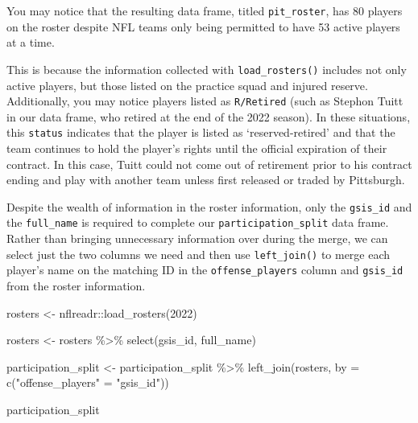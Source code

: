 \documentclass[
  letterpaper,
]{krantz}
\newenvironment{Shaded}{\begin{snugshade}}{\end{snugshade}}
\newcommand{\AttributeTok}[1]{\textcolor[rgb]{0.40,0.45,0.13}{#1}}
\newcommand{\DecValTok}[1]{\textcolor[rgb]{0.68,0.00,0.00}{#1}}
\newcommand{\FunctionTok}[1]{\textcolor[rgb]{0.28,0.35,0.67}{#1}}
\newcommand{\NormalTok}[1]{\textcolor[rgb]{0.00,0.23,0.31}{#1}}
\newcommand{\OtherTok}[1]{\textcolor[rgb]{0.00,0.23,0.31}{#1}}
\newcommand{\SpecialCharTok}[1]{\textcolor[rgb]{0.37,0.37,0.37}{#1}}
\newcommand{\StringTok}[1]{\textcolor[rgb]{0.13,0.47,0.30}{#1}}
\begin{document}
\begin{tcolorbox}[enhanced jigsaw, colback=white, leftrule=.75mm, breakable, colframe=quarto-callout-note-color-frame, bottomtitle=1mm, rightrule=.15mm, left=2mm, opacityback=0, bottomrule=.15mm, arc=.35mm, coltitle=black, colbacktitle=quarto-callout-note-color!10!white, toptitle=1mm, titlerule=0mm, title=\textcolor{quarto-callout-note-color}{\faInfo}\hspace{0.5em}{Note}, toprule=.15mm, opacitybacktitle=0.6]

You may notice that the resulting data frame, titled
\texttt{pit\_roster}, has 80 players on the roster despite NFL teams
only being permitted to have 53 active players at a time.

This is because the information collected with \texttt{load\_rosters()}
includes not only active players, but those listed on the practice squad
and injured reserve. Additionally, you may notice players listed as
\texttt{R/Retired} (such as Stephon Tuitt in our data frame, who retired
at the end of the 2022 season). In these situations, this
\texttt{status} indicates that the player is listed as
`reserved-retired' and that the team continues to hold the player's
rights until the official expiration of their contract. In this case,
Tuitt could not come out of retirement prior to his contract ending and
play with another team unless first released or traded by Pittsburgh.

\end{tcolorbox}

Despite the wealth of information in the roster information, only the
\texttt{gsis\_id} and the \texttt{full\_name} is required to complete
our \texttt{participation\_split} data frame. Rather than bringing
unnecessary information over during the merge, we can select just the
two columns we need and then use \texttt{left\_join()} to merge each
player's name on the matching ID in the \texttt{offense\_players} column
and \texttt{gsis\_id} from the roster information.

\begin{Shaded}
\begin{Highlighting}[]
\NormalTok{rosters }\OtherTok{\textless{}{-}}\NormalTok{ nflreadr}\SpecialCharTok{::}\FunctionTok{load\_rosters}\NormalTok{(}\DecValTok{2022}\NormalTok{)}

\NormalTok{rosters }\OtherTok{\textless{}{-}}\NormalTok{ rosters }\SpecialCharTok{\%\textgreater{}\%}
  \FunctionTok{select}\NormalTok{(gsis\_id, full\_name)}

\NormalTok{participation\_split }\OtherTok{\textless{}{-}}\NormalTok{ participation\_split }\SpecialCharTok{\%\textgreater{}\%}
  \FunctionTok{left\_join}\NormalTok{(rosters, }\AttributeTok{by =} \FunctionTok{c}\NormalTok{(}\StringTok{"offense\_players"} \OtherTok{=} \StringTok{"gsis\_id"}\NormalTok{))}

\NormalTok{participation\_split}
\end{Highlighting}
\end{Shaded}
\end{document}
